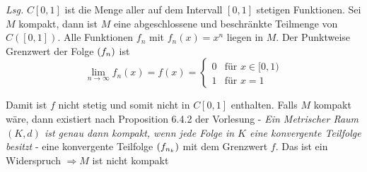 \documentclass{scrreprt}
\begin{document}
\textit{Lsg.} $C[0, 1]$ ist die Menge aller auf dem Intervall $[0, 1]$ stetigen
Funktionen.
Sei $M$ kompakt, dann ist $M$ eine abgeschlossene und beschränkte Teilmenge von
$C([0, 1])$.
Alle Funktionen $f_n$ mit $f_n(x) = x^n$ liegen in $M$.
Der Punktweise Grenzwert der Folge $\qty(f_n)$ ist
\[
  \lim_{n \to \infty} f_n(x) = f(x) = \begin{cases}
    0 & \text{für } x \in [0, 1) \\
    1 & \text{für } x = 1
  \end{cases}
\]

Damit ist $f$ nicht stetig und somit nicht in $C[0, 1]$ enthalten.
Falls $M$ kompakt wäre, dann existiert nach Proposition 6.4.2 der Vorlesung -
\textit{Ein Metrischer Raum $(K, d)$ ist genau dann kompakt, wenn jede Folge in
  $K$ eine konvergente Teilfolge besitzt} - eine konvergente Teilfolge
$\qty(f_{n_k})$ mit dem Grenzwert $f$.
Das ist ein Widerspruch $\Rightarrow M$ ist nicht kompakt
\end{document}
